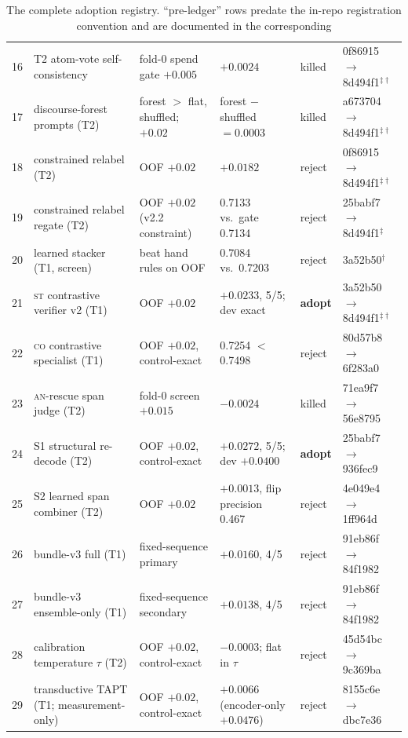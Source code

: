 \documentclass[11pt]{article}
\newcommand{\lab}[1]{\textsc{#1}}
\newcommand{\co}{\lab{co}}
\newcommand{\st}{\lab{st}}
\newcommand{\an}{\lab{an}}
\begin{document}
\begin{table}[t]
\begin{tabular}{rlllll}
16 & T2 atom-vote self-consistency & fold-0 spend gate $+0.005$ & $+0.0024$ & killed & 0f86915 $\rightarrow$ 8d494f1$^{\ddagger\dagger}$ \\
17 & discourse-forest prompts (T2) & forest $>$ flat, shuffled; $+0.02$ & forest $-$ shuffled $= 0.0003$ & killed & a673704 $\rightarrow$ 8d494f1$^{\ddagger\dagger}$ \\
18 & constrained relabel (T2) & OOF $+0.02$ & $+0.0182$ & reject & 0f86915 $\rightarrow$ 8d494f1$^{\ddagger\dagger}$ \\
19 & constrained relabel regate (T2) & OOF $+0.02$ (v2.2 constraint) & 0.7133 vs.\ gate 0.7134 & reject & 25babf7 $\rightarrow$ 8d494f1$^{\ddagger}$ \\
20 & learned stacker (T1, screen) & beat hand rules on OOF & 0.7084 vs.\ 0.7203 & reject & 3a52b50$^{\dagger}$ \\
21 & \st{} contrastive verifier v2 (T1) & OOF $+0.02$ & $+0.0233$, 5/5; dev exact & \textbf{adopt} & 3a52b50 $\rightarrow$ 8d494f1$^{\ddagger\dagger}$ \\
22 & \co{} contrastive specialist (T1) & OOF $+0.02$, control-exact & 0.7254 $<$ 0.7498 & reject & 80d57b8 $\rightarrow$ 6f283a0 \\
23 & \an-rescue span judge (T2) & fold-0 screen $+0.015$ & $-0.0024$ & killed & 71ea9f7 $\rightarrow$ 56e8795 \\
24 & S1 structural re-decode (T2) & OOF $+0.02$, control-exact & $+0.0272$, 5/5; dev $+0.0400$ & \textbf{adopt} & 25babf7 $\rightarrow$ 936fec9 \\
25 & S2 learned span combiner (T2) & OOF $+0.02$ & $+0.0013$, flip precision 0.467 & reject & 4e049e4 $\rightarrow$ 1ff964d \\
26 & bundle-v3 full (T1) & fixed-sequence primary & $+0.0160$, 4/5 & reject & 91eb86f $\rightarrow$ 84f1982 \\
27 & bundle-v3 ensemble-only (T1) & fixed-sequence secondary & $+0.0138$, 4/5 & reject & 91eb86f $\rightarrow$ 84f1982 \\
28 & calibration temperature $\tau$ (T2) & OOF $+0.02$, control-exact & $-0.0003$; flat in $\tau$ & reject & 45d54bc $\rightarrow$ 9c369ba \\
29 & transductive TAPT (T1; measurement-only) & OOF $+0.02$, control-exact & $+0.0066$ (encoder-only $+0.0476$) & reject & 8155c6e $\rightarrow$ dbc7e36 \\
\bottomrule
\end{tabular}
\caption{The complete adoption registry. ``pre-ledger'' rows predate the
in-repo registration convention and are documented in the corresponding
}
\end{table}
\end{document}
